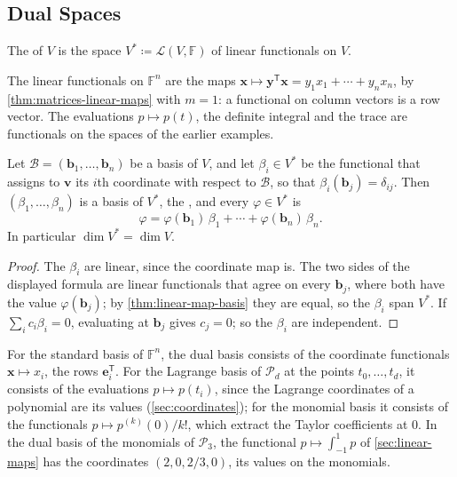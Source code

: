 \subsection{Dual Spaces}

\begin{definition}
\label{def:dual}
The  of $V$ is the space $V^*\coloneqq\mathcal L(V,\mathbb F)$ of linear functionals on $V$.
\end{definition}

The linear functionals on $\mathbb F^n$ are the maps $\mathbf x\mapsto\mathbf y^{\mathsf T}\mathbf x=y_1x_1+\cdots+y_nx_n$, by \cref{thm:matrices-linear-maps} with $m=1$: a functional on column vectors is a row vector. The evaluations $p\mapsto p(t)$, the definite integral and the trace are functionals on the spaces of the earlier examples.

\begin{proposition}
\label{prop:dual-basis}
Let $\mathcal B=(\mathbf b_1,\ldots,\mathbf b_n)$ be a basis of $V$, and let $\beta_i\in V^*$ be the functional that assigns to $\mathbf v$ its $i$th coordinate with respect to $\mathcal B$, so that $\beta_i(\mathbf b_j)=\delta_{ij}$. Then $(\beta_1,\ldots,\beta_n)$ is a basis of $V^*$, the , and every $\varphi\in V^*$ is
\[
\varphi=\varphi(\mathbf b_1)\,\beta_1+\cdots+\varphi(\mathbf b_n)\,\beta_n .
\]
In particular $\dim V^*=\dim V$.
\end{proposition}

\begin{proof}
The $\beta_i$ are linear, since the coordinate map is. The two sides of the displayed formula are linear functionals that agree on every $\mathbf b_j$, where both have the value $\varphi(\mathbf b_j)$; by \cref{thm:linear-map-basis} they are equal, so the $\beta_i$ span $V^*$. If $\sum_ic_i\beta_i=0$, evaluating at $\mathbf b_j$ gives $c_j=0$; so the $\beta_i$ are independent.
\end{proof}

For the standard basis of $\mathbb F^n$, the dual basis consists of the coordinate functionals $\mathbf x\mapsto x_i$, the rows $\mathbf e_i^{\mathsf T}$. For the Lagrange basis of $\mathcal P_d$ at the points $t_0,\ldots,t_d$, it consists of the evaluations $p\mapsto p(t_i)$, since the Lagrange coordinates of a polynomial are its values (\cref{sec:coordinates}); for the monomial basis it consists of the functionals $p\mapsto p^{(k)}(0)/k!$, which extract the Taylor coefficients at $0$. In the dual basis of the monomials of $\mathcal P_3$, the functional $p\mapsto\int_{-1}^1p$ of \cref{sec:linear-maps} has the coordinates $(2,0,2/3,0)$, its values on the monomials.

